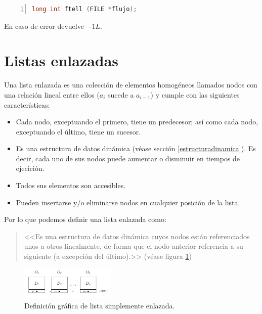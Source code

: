 \documentclass[a4paper, 11pt, titlepage]{article}
\begin{document}
            \begin{lstlisting}[language=C,numbers=left,basicstyle=\small]
    long int ftell (FILE *flujo);\end{lstlisting}

            En caso de error devuelve $-1L$.
        
\section{Listas enlazadas}\label{listasenlazadas}

    Una lista enlazada es una colección de elementos homogéneos llamados nodos con una relación
    lineal entre ellos ($a_i$ sucede a $a_{i-1}$) y cumple con las siguientes características:
    
    \begin{itemize}
        \item Cada nodo, exceptuando el primero, tiene un predecesor; así como cada nodo, 
        exceptuando el último, tiene un sucesor.
        \item Es una estructura de datos dinámica (véase sección \ref{estructuradinamica}). Es 
        decir, cada uno de sus nodos puede aumentar o disminuir en tiempos de ejecición.
        \item Todos sus elementos son accesibles.
        \item Pueden insertarse y/o eliminarse nodos en cualquier posición de la lista.
    \end{itemize}

    Por lo que podemos definir una lista enlazada como:

    \begin{quotation}
        \small <<Es una estructura de datos dinámica cuyos nodos están referenciados 
        unos a otros linealmente, de forma que el nodo anterior referencia a su 
        siguiente (a excepción del último).>> (véase figura \ref{listaenlazada01})
    \end{quotation}

    \begin{figure}[htp]
        \centering
        \includegraphics[width=0.4\textwidth]{resources/listaenlazada01.jpg}
        \caption{Definición gráfica de lista simplemente enlazada.}
        \label{listaenlazada01}
    \end{figure}
\end{document}
